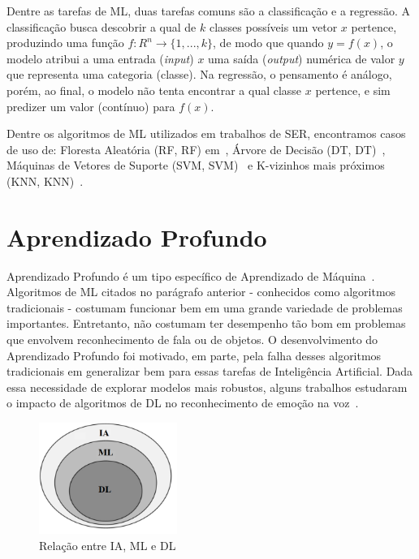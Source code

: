 Dentre as tarefas de \acrshort{ML}, duas tarefas comuns são a classificação e a regressão. A classificação busca descobrir a qual de $k$ classes possíveis um vetor $x$ pertence, produzindo uma função $f: R^n \rightarrow \{1, ..., k\}$, de modo que quando $y = f(x)$, o modelo atribui a uma entrada (\textit{input}) $x$ uma saída (\textit{output}) numérica de valor $y$ que representa uma categoria (classe). Na regressão, o pensamento é análogo, porém, ao final, o modelo não tenta encontrar a qual classe $x$ pertence, e sim predizer um valor (contínuo) para $f(x)$.

Dentre os algoritmos de \acrshort{ML} utilizados em trabalhos de \acrshort{SER}, encontramos casos de uso de: Floresta Aleatória (\acrlong{RF}, \acrshort{RF}) em~\cite{20.10}, Árvore de Decisão (\acrlong{DT}, \acrshort{DT})~\cite{20.11}, Máquinas de Vetores de Suporte (\acrlong{SVM}, \acrshort{SVM})~\cite{20.13} e K-vizinhos mais próximos (\acrlong{KNN}, \acrshort{KNN})~\cite{20.15}.

\section{Aprendizado Profundo}\label{sec:dl}

Aprendizado Profundo é um tipo específico de Aprendizado de Máquina~\cite{53}. Algoritmos de \acrshort{ML} citados no parágrafo anterior - conhecidos como algoritmos tradicionais - costumam funcionar bem em uma grande variedade de problemas importantes. Entretanto, não costumam ter desempenho tão bom em problemas que envolvem reconhecimento de fala ou de objetos. O desenvolvimento do Aprendizado Profundo foi motivado, em parte, pela falha desses algoritmos tradicionais em generalizar bem para essas tarefas de Inteligência Artificial. Dada essa necessidade de explorar modelos mais robustos, alguns trabalhos estudaram o impacto de algoritmos de \acrlong{DL} no reconhecimento de emoção na voz~\cite{12.12, 12.16}.

\begin{figure}[!h]
\centering
\includegraphics[width=0.4\textwidth]{img/ia-ml-dl-3.png}
\caption{\label{fig:ia-ml-dl}Relação entre \acrshort{IA}, \acrshort{ML} e \acrshort{DL}~\cite{img_iavsmlvsdl}}
\author{Fonte: Retirada de~\cite{58}}
\end{figure}

